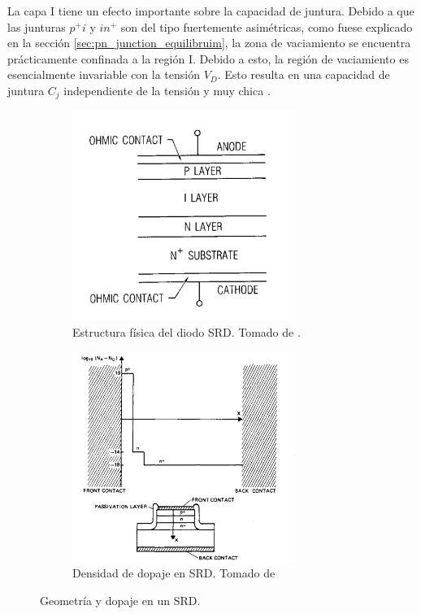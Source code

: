 La capa I tiene un efecto importante sobre la capacidad de juntura. Debido a que
las junturas $p^+i$ y $in^+$ son del tipo fuertemente asimétricas, como fuese
explicado en la sección \ref{sec:pn_junction_equilibruim}, la zona de
vaciamiento se encuentra prácticamente confinada a la región I. Debido a esto,
la región de vaciamiento es esencialmente invariable con la tensión $V_D$. Esto
resulta en una capacidad de juntura $C_j$ independiente de la tensión y muy
chica \cite{maas2003} \cite{Sze2006} \cite{moll1969}.

\begin{figure}[t]
    \centering
    \begin{subfigure}[b]{0.45\textwidth}
        \centering
        \includegraphics[width=0.8\textwidth]{images/srd_diode_structure.jpg}
        \caption{Estructura física del diodo SRD. Tomado de \cite{maas2003}.}
        \label{fig:srd_diode_structure}
    \end{subfigure}
    \hfill
    \begin{subfigure}[b]{0.45\textwidth}
        \centering
        \includegraphics[width=0.8\textwidth]{images/srd_impurity_profile.jpg}
        \caption{Densidad de dopaje en SRD. Tomado de \cite{moll1969}}
        \label{fig:srd_impurity_profile}
    \end{subfigure}
    \caption{Geometría y dopaje en un SRD.}
    \label{fig:srd_gemotry_and_doping}
\end{figure}


